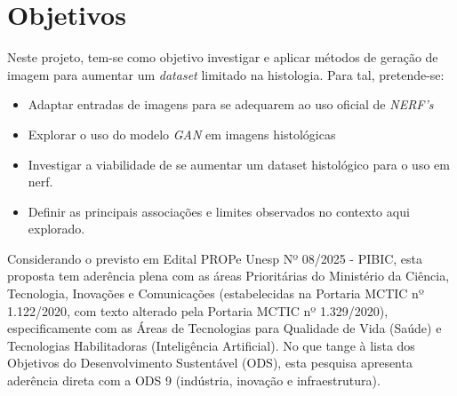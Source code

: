 \section{Objetivos}


Neste projeto, tem-se como objetivo investigar e aplicar métodos de geração de imagem para aumentar um \textit{dataset} limitado na histologia. Para tal, pretende-se:

\begin{itemize}
  \item Adaptar entradas de imagens para se adequarem ao uso oficial de \textit{NERF's}
  \item Explorar o uso do modelo \textit{GAN} em imagens histológicas
  \item Investigar a viabilidade de se aumentar um dataset histológico para o uso em nerf.
  \item Definir as principais associações e limites observados no contexto aqui explorado.
\end{itemize}

%
%    
%
Considerando o previsto em Edital PROPe Unesp Nº 08/2025 - PIBIC, esta proposta tem aderência plena com as áreas Prioritárias do Ministério da Ciência, Tecnologia, Inovações e Comunicações (estabelecidas na Portaria MCTIC nº 1.122/2020, com texto alterado pela Portaria MCTIC nº 1.329/2020), especificamente com as Áreas de Tecnologias para Qualidade de Vida (Saúde) e Tecnologias Habilitadoras (Inteligência Artificial). No que tange à lista dos Objetivos do Desenvolvimento Sustentável (ODS), esta pesquisa apresenta aderência direta com a ODS 9 (indústria, inovação e infraestrutura).
